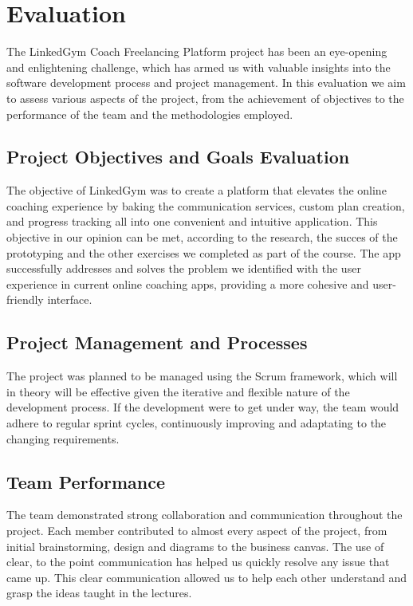 

\section{Evaluation}

The LinkedGym Coach Freelancing Platform project has been an eye-opening and enlightening challenge, which has armed us with valuable insights into the software development process and project management. In this evaluation we aim to assess various aspects of the project, from the achievement of objectives to the performance of the team and the methodologies employed.

\subsection{Project Objectives and Goals Evaluation}
The objective of LinkedGym was to create a platform that elevates the online coaching experience by baking the communication services, custom plan creation, and progress tracking all into one convenient and intuitive application. This objective in our opinion can be met, according to the research, the succes of the prototyping and the other exercises we completed as part of the course. The app successfully addresses and solves the problem we identified with the user experience in current online coaching apps, providing a more cohesive and user-friendly interface.

\subsection{Project Management and Processes}
The project was planned to be managed using the Scrum framework, which will in theory will be effective given the iterative and flexible nature of the development process. If the development were to get under way, the team would adhere to regular sprint cycles, continuously improving and adaptating to the changing requirements.

\subsection{Team Performance}
The team demonstrated strong collaboration and communication throughout the project. Each member contributed to almost every aspect of the project, from initial brainstorming, design and diagrams to the business canvas. The use of clear, to the point communication has helped us quickly resolve any issue that came up. This clear communication allowed us to help each other understand and grasp the ideas taught in the lectures.

